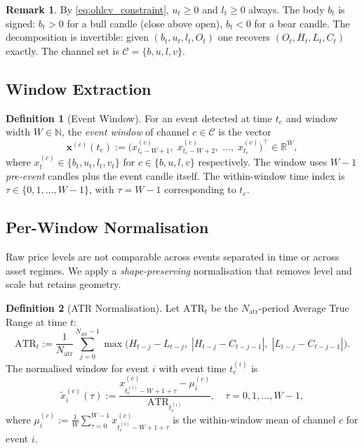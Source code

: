 \documentclass[11pt,a4paper]{article}
\theoremstyle{definition}
\newtheorem{definition}{Definition}[section]
\newtheorem{remark}{Remark}[section]
\theoremstyle{plain}
\newcommand{\R}{\mathbb{R}}
\newcommand{\N}{\mathbb{N}}
\newcommand{\bvec}[1]{\mathbf{#1}}
\begin{document}
\begin{remark}
By \eqref{eq:ohlcv_constraint}, $u_t \geq 0$ and $l_t \geq 0$ always. The body $b_t$
is signed: $b_t > 0$ for a bull candle (close above open), $b_t < 0$ for a bear candle.
The decomposition is invertible: given $(b_t, u_t, l_t, O_t)$ one recovers
$(O_t, H_t, L_t, C_t)$ exactly. The channel set is $\mathcal{C} = \{b, u, l, v\}$.
\end{remark}

\subsection{Window Extraction}

\begin{definition}[Event Window]
\label{def:window}
For an event detected at time $t_e$ and window width $W \in \N$, the \emph{event window}
of channel $c \in \mathcal{C}$ is the vector
\begin{equation}
    \bvec{x}^{(c)}(t_e) :=
    \bigl(x^{(c)}_{t_e - W + 1},\;
          x^{(c)}_{t_e - W + 2},\;
          \ldots,\;
          x^{(c)}_{t_e}\bigr)^\top
    \in \R^W,
    \label{eq:window_vector}
\end{equation}
where $x^{(c)}_t \in \{b_t, u_t, l_t, v_t\}$ for $c \in \{b, u, l, v\}$ respectively.
The window uses $W - 1$ \emph{pre-event} candles plus the event candle itself. The
within-window time index is $\tau \in \{0, 1, \ldots, W-1\}$, with $\tau = W-1$
corresponding to $t_e$.
\end{definition}

\subsection{Per-Window Normalisation}
\label{sec:normalisation}

Raw price levels are not comparable across events separated in time or across asset
regimes. We apply a \emph{shape-preserving} normalisation that removes level and scale
but retains geometry.

\begin{definition}[ATR Normalisation]
\label{def:normalisation}
Let $\mathrm{ATR}_t$ be the $N_{\mathrm{atr}}$-period Average True Range at time $t$:
\begin{equation}
    \mathrm{ATR}_t :=
    \frac{1}{N_{\mathrm{atr}}}
    \sum_{j=0}^{N_{\mathrm{atr}}-1}
    \max\!\bigl(H_{t-j} - L_{t-j},\;
                |H_{t-j} - C_{t-j-1}|,\;
                |L_{t-j} - C_{t-j-1}|\bigr).
    \label{eq:atr}
\end{equation}
The normalised window for event $i$ with event time $t_e^{(i)}$ is
\begin{equation}
    \tilde{x}^{(c)}_i(\tau) :=
    \frac{x^{(c)}_{t_e^{(i)} - W + 1 + \tau} - \mu^{(c)}_i}
         {\mathrm{ATR}_{t_e^{(i)}}},
    \quad \tau = 0, 1, \ldots, W-1,
    \label{eq:normalised_window}
\end{equation}
where $\mu^{(c)}_i := \frac{1}{W}\sum_{\tau=0}^{W-1} x^{(c)}_{t_e^{(i)}-W+1+\tau}$
is the within-window mean of channel $c$ for event $i$.
\end{definition}
\end{document}

